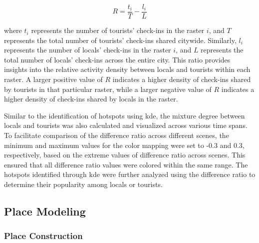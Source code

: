 \documentclass{article}
\theoremstyle{remark}
\begin{document}
\begin{equation} \label{eq:diff_ratio}
    R = \frac{t_{i}}{T}-\frac{l_{i}}{L}
\end{equation}

where $t_{i}$ represents the number of tourists' check-ins in the raster $i$, and $T$ represents the total number of tourists' check-ins shared citywide. Similarly, $l_{i}$ represents the number of locals' check-ins in the raster $i$, and $L$ represents the total number of locals' check-ins across the entire city. This ratio provides insights into the relative activity density between locals and tourists within each raster. A larger positive value of $R$ indicates a higher density of check-ins shared by tourists in that particular raster, while a larger negative value of \(R\) indicates a higher density of check-ins shared by locals in the raster.

Similar to the identification of hotspots using \acrshort{kde}, the mixture degree between locals and tourists was also calculated and visualized across various time spans. To facilitate comparison of the difference ratio across different scenes, the minimum and maximum values for the color mapping were set to -0.3 and 0.3, respectively, based on the extreme values of difference ratio across scenes. This ensured that all difference ratio values were colored within the same range. The hotspots identified through \acrshort{kde} were further analyzed using the difference ratio to determine their popularity among locals or tourists.


\subsection{Place Modeling} \label{place_modeling}

\subsubsection{Place Construction} \label{place_construction}
\end{document}
